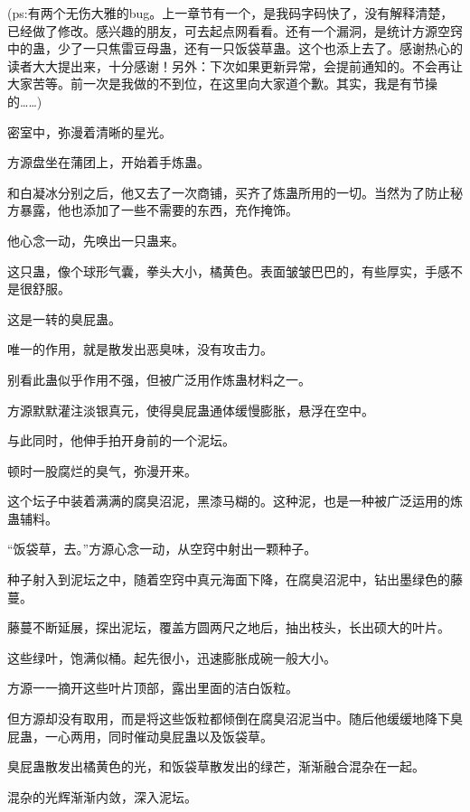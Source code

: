 
\begin{this_body}

(ps:有两个无伤大雅的bug。上一章节有一个，是我码字码快了，没有解释清楚，已经做了修改。感兴趣的朋友，可去起点网看看。还有一个漏洞，是统计方源空窍中的蛊，少了一只焦雷豆母蛊，还有一只饭袋草蛊。这个也添上去了。感谢热心的读者大大提出来，十分感谢！另外：下次如果更新异常，会提前通知的。不会再让大家苦等。前一次是我做的不到位，在这里向大家道个歉。其实，我是有节操的……)

密室中，弥漫着清晰的星光。

方源盘坐在蒲团上，开始着手炼蛊。

和白凝冰分别之后，他又去了一次商铺，买齐了炼蛊所用的一切。当然为了防止秘方暴露，他也添加了一些不需要的东西，充作掩饰。

他心念一动，先唤出一只蛊来。

这只蛊，像个球形气囊，拳头大小，橘黄色。表面皱皱巴巴的，有些厚实，手感不是很舒服。

这是一转的臭屁蛊。

唯一的作用，就是散发出恶臭味，没有攻击力。

别看此蛊似乎作用不强，但被广泛用作炼蛊材料之一。

方源默默灌注淡银真元，使得臭屁蛊通体缓慢膨胀，悬浮在空中。

与此同时，他伸手拍开身前的一个泥坛。

顿时一股腐烂的臭气，弥漫开来。

这个坛子中装着满满的腐臭沼泥，黑漆马糊的。这种泥，也是一种被广泛运用的炼蛊辅料。

“饭袋草，去。”方源心念一动，从空窍中射出一颗种子。

种子射入到泥坛之中，随着空窍中真元海面下降，在腐臭沼泥中，钻出墨绿色的藤蔓。

藤蔓不断延展，探出泥坛，覆盖方圆两尺之地后，抽出枝头，长出硕大的叶片。

这些绿叶，饱满似桶。起先很小，迅速膨胀成碗一般大小。

方源一一摘开这些叶片顶部，露出里面的洁白饭粒。

但方源却没有取用，而是将这些饭粒都倾倒在腐臭沼泥当中。随后他缓缓地降下臭屁蛊，一心两用，同时催动臭屁蛊以及饭袋草。

臭屁蛊散发出橘黄色的光，和饭袋草散发出的绿芒，渐渐融合混杂在一起。

混杂的光辉渐渐内敛，深入泥坛。


\end{this_body}
